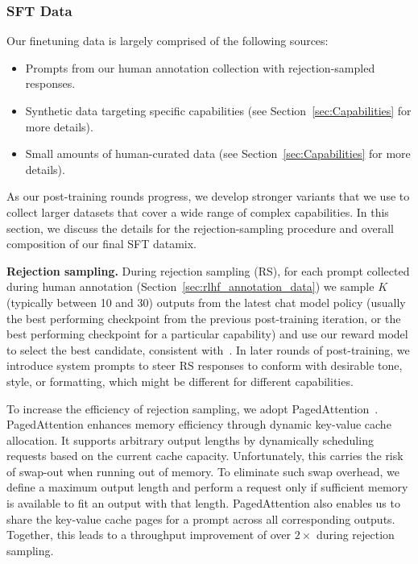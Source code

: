 \documentclass[dvipsnames]{fairmeta}
\begin{document}
\subsubsection{SFT Data}
\label{subsubsec:sft_data} 

Our finetuning data is largely comprised of the following sources:

\begin{itemize}
    \item Prompts from our human annotation collection with rejection-sampled responses.
    \item Synthetic data targeting specific capabilities (see Section~\ref{sec:Capabilities} for more details).
    \item Small amounts of human-curated data (see Section~\ref{sec:Capabilities} for more details).
\end{itemize}

As our post-training rounds progress, we develop stronger \llamathree variants that we use to collect larger datasets that cover a wide range of complex capabilities. In this section, we discuss the details for the rejection-sampling procedure and overall composition of our final SFT datamix.

\textbf{Rejection sampling.}
During rejection sampling (RS), for each prompt collected during human annotation (Section~\ref{sec:rlhf_annotation_data}) we sample $K$ (typically between 10 and 30) outputs from the latest chat model policy (usually the best performing checkpoint from the previous post-training iteration, or the best performing checkpoint for a particular capability) and use our reward model to select the best candidate, consistent with~\citet{constitutional-ai-bai}. 
In later rounds of post-training, we introduce system prompts to steer RS responses to conform with desirable tone, style, or formatting, which might be different for different capabilities. 

To increase the efficiency of rejection sampling, we adopt PagedAttention~\citep{kwon2023efficient}.
PagedAttention enhances memory efficiency through dynamic key-value cache allocation. 
It supports arbitrary output lengths by dynamically scheduling requests based on the current cache capacity.
Unfortunately, this carries the risk of swap-out when running out of memory. 
To eliminate such swap overhead, we define a maximum output length and perform a request only if sufficient memory is available to fit an output with that length.
PagedAttention also enables us to share the key-value cache pages for a prompt across all corresponding outputs.
Together, this leads to a throughput improvement of over $2 \times$ during rejection sampling.
\end{document}
